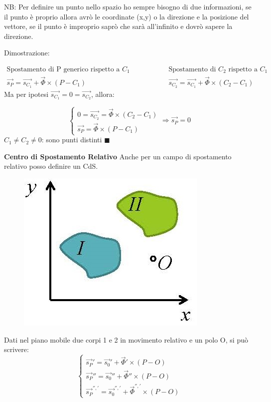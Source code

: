 \documentclass{article}
\begin{document}
\begin{adjustwidth}{2in}{}
NB: Per definire un punto nello spazio ho sempre bisogno di due informazioni, se il punto è proprio allora avrò le coordinate (x,y) o la direzione e la posizione del vettore, se il punto è improprio saprò che sarà all'infinito e dovrò sapere la direzione. \newline

Dimostrazione: 

\[
\begin{array}{c}
	\text{Spostamento di P generico rispetto a $C_1$} \\
	\vec{s_P} = \vec{s_{C_1}} + \vec{\Phi}\times (P-C_1)
\end{array}  \hspace{2cm}
\begin{array}{c}
		\text{Spostamento di $C_2$ rispetto a $C_1$} \\
 \vec{s_{C_2}} = \vec{s_{C_1}} + \vec{\Phi} \times (C_2-C_1)
\end{array}
\]
Ma per ipotesi $ \vec{s_{C_1}} = 0 = \vec{s_{C_2}}$, allora:

\[
\begin{cases}
	0 = \vec{s_{C_2}} = \vec{\Phi} \times (C_2-C_1) \\
	\vec{s_P} = \vec{\Phi} \times (P-C_1)
	\end{cases} \Rightarrow \vec{s_P} = 0  
\] 
$C_1 \ne C_2 \ne 0$: sono punti distinti $\blacksquare$ \newline 

{\Large \textbf{Centro di Spostamento Relativo}} \mbox{} \newline
Anche per un campo di spostamento relativo posso definire un CdS.
\begin{figure}[H]
	\centering
	\includegraphics[width=0.2\linewidth]{immagini/1.PARTE3_Pagina_06}
\end{figure}

Dati nel piano mobile due corpi 1 e 2 in movimento relativo e un polo O, si può scrivere:
\[
\begin{cases}
\vec{s_P}' = \vec{s_0}' + \vec{\Phi}' \times (P-O) \\
\vec{s_P}'' = \vec{s_0}'' + \vec{\Phi}'' \times (P-O) \\
\vec{s_P}^{'', '} = \vec{s_0}^{'', '}  + \vec{\Phi}^{'', '}  \times (P-O) 
\end{cases}
\]


\end{adjustwidth}
\end{document}
